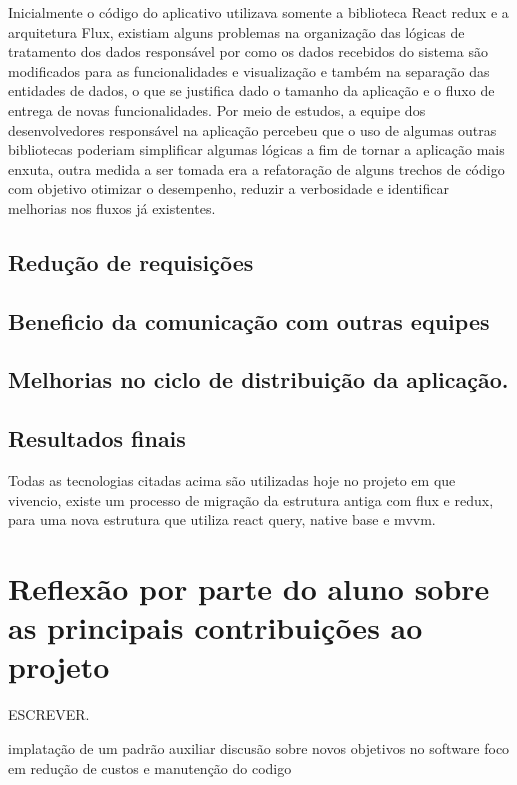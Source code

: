 \documentclass{ufersa}
\begin{document}
Inicialmente o código do aplicativo utilizava somente a biblioteca React redux e a arquitetura Flux, existiam alguns problemas na organização das lógicas de tratamento dos dados responsável por como os dados recebidos do sistema são modificados para as funcionalidades e visualização e também na separação das entidades de dados, o que se justifica dado o tamanho da aplicação e o fluxo de entrega de novas funcionalidades. Por meio de estudos, a equipe dos desenvolvedores responsável na aplicação percebeu que o uso de algumas outras bibliotecas poderiam simplificar algumas lógicas a fim de tornar a aplicação mais enxuta, outra medida a ser tomada era a refatoração de alguns trechos de código com objetivo otimizar o desempenho, reduzir a verbosidade e identificar melhorias nos fluxos já existentes.

\subsection{Redução de requisições}



\subsection{Beneficio da comunicação com outras equipes}

\subsection{Melhorias no ciclo de distribuição da aplicação.}

\subsection{Resultados finais}

Todas as tecnologias citadas acima são utilizadas hoje no projeto em que vivencio, existe um processo de migração da estrutura antiga com flux e redux, para uma nova estrutura que utiliza react query, native base e mvvm.


\section{Reflexão por parte do aluno sobre as principais contribuições ao projeto}
ESCREVER.

implatação de um padrão auxiliar
discusão sobre novos objetivos no software
foco em redução de custos e manutenção do codigo
\end{document}
